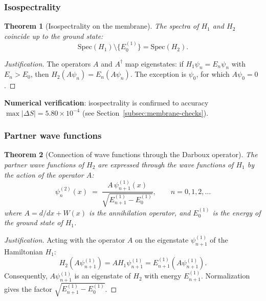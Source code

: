 \documentclass[11pt,a4paper]{article}
\newtheorem{theorem}{Theorem}[section]
\theoremstyle{definition}
\begin{document}
\subsubsection{Isospectrality}

\begin{theorem}[Isospectrality on the membrane]
\label{thm:membrane-isospectrality}
The spectra of $H_1$ and $H_2$ coincide up to the ground state:
\begin{equation}
    \boxed{
    \mathrm{Spec}(H_1) \setminus \{E_0^{(1)}\} = \mathrm{Spec}(H_2).
    }
    \label{eq:membrane-isospectrality}
\end{equation}
\end{theorem}

\begin{proof}[Justification]
The operators $A$ and $A^\dagger$ map eigenstates:
if $H_1 \psi_n = E_n \psi_n$ with $E_n > E_0$, then
$H_2 (A \psi_n) = E_n (A \psi_n)$. The exception is $\psi_0$,
for which $A \psi_0 = 0$.
\end{proof}

\medskip\noindent
\textbf{Numerical verification}: isospectrality is confirmed
to accuracy $\max|\Delta S| = 5.80 \times 10^{-4}$ (see Section~\ref{subsec:membrane-checks}).

\subsubsection{Partner wave functions}
\label{subsubsec:membrane-partner-wf}

\begin{theorem}[Connection of wave functions through the Darboux operator]
\label{thm:partner-wave-functions}
The partner wave functions of $H_2$ are expressed through
the wave functions of $H_1$ by the action of the operator $A$:
\begin{equation}
    \boxed{
    \psi_n^{(2)}(x) \;=\; \frac{A \, \psi_{n+1}^{(1)}(x)}
    {\sqrt{E_{n+1}^{(1)} - E_0^{(1)}}},
    \qquad n = 0, 1, 2, \ldots
    }
    \label{eq:partner-wave-functions}
\end{equation}
where $A = d/dx + W(x)$ is the annihilation operator, and
$E_0^{(1)}$ is the energy of the ground state of $H_1$.
\end{theorem}

\begin{proof}[Justification]
Acting with the operator $A$ on the eigenstate $\psi_{n+1}^{(1)}$
of the Hamiltonian $H_1$:
\begin{equation}
    H_2 \left( A \psi_{n+1}^{(1)} \right)
    = A H_1 \psi_{n+1}^{(1)}
    = E_{n+1}^{(1)} \left( A \psi_{n+1}^{(1)} \right).
\end{equation}
Consequently, $A \psi_{n+1}^{(1)}$ is an eigenstate of
$H_2$ with energy $E_{n+1}^{(1)}$. Normalization gives the factor
$\sqrt{E_{n+1}^{(1)} - E_0^{(1)}}$.
\end{proof}
\end{document}

